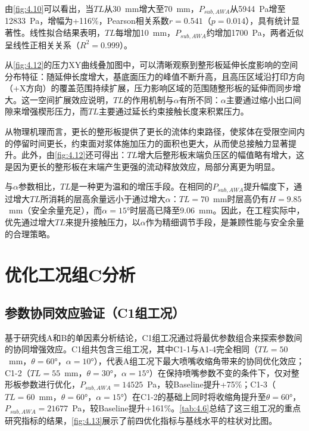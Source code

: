 由\cref{fig:4.10}可以看出，当$TL$从30~mm增大至70~mm，$P_{sub,AWA}$从5944~Pa增至12833~Pa，增幅为+116\%，Pearson相关系数$r = 0.541$（$p = 0.014$），具有统计显著性。线性拟合结果表明，$TL$每增加10~mm，$P_{sub,AWA}$约增加1700~Pa，两者近似呈线性正相关关系（$R^2 = 0.999$）。

从\cref{fig:4.12}的压力XY曲线叠加图中，可以清晰观察到整形板延伸长度影响的空间分布特征：随延伸长度增大，基底面压力的峰值不断升高，且高压区域沿打印方向（+X方向）的覆盖范围持续扩展，压力影响区域的范围随整形板的延伸而同步增大。这一空间扩展效应说明，$TL$的作用机制与$\alpha$有所不同：$\alpha$主要通过缩小出口间隙来增强楔形压力，而$TL$主要通过延长约束接触长度来积累压力。

从物理机理而言，更长的整形板提供了更长的流体约束路径，使浆体在受限空间内的停留时间更长，约束面对浆体施加压力的面积也更大，从而使总接触力显著提升。此外，由\cref{fig:4.12}还可得出：$TL$增大后整形板末端负压区的幅值略有增大，这是因为更长的整形板在末端产生更强的流动释放效应，局部分离更为明显。

与$\alpha$参数相比，$TL$是一种更为温和的增压手段。在相同的$P_{sub,AWA}$提升幅度下，通过增大$TL$所消耗的层高余量远小于通过增大$\alpha$：$TL = 70$~mm时层高仍有$H = 9.85$~mm（安全余量充足），而$\alpha = 15°$时层高已降至9.06~mm。因此，在工程实际中，优先通过增大$TL$来提升接触压力，以$\alpha$作为精细调节手段，是兼顾性能与安全余量的合理策略。

\section{优化工况组C分析}

\subsection{参数协同效应验证（C1组工况）}

基于研究线A和B的单因素分析结论，C1组工况通过将最优参数组合来探索参数间的协同增强效应。C1组共包含三组工况，其中C1-1与A1-4完全相同（$TL = 50$~mm，$\theta = 60°$，$\alpha = 10°$），代表A组工况下最大喷嘴收缩角带来的协同优化效应；C1-2（$TL = 55$~mm，$\theta = 30°$，$\alpha = 15°$）在保持喷嘴参数不变的条件下，仅对整形板参数进行优化，$P_{sub,AWA} = 14525$~Pa，较Baseline提升+75\%；C1-3（$TL = 60$~mm，$\theta = 60°$，$\alpha = 15°$）在C1-2的基础上同时将收缩角提升至$\theta = 60°$，$P_{sub,AWA} = 21677$~Pa，较Baseline提升+161\%。\cref{tab:4.6}总结了这三组工况的重点研究指标的结果，\cref{fig:4.13}展示了前四优化指标与基线水平的柱状对比图。

